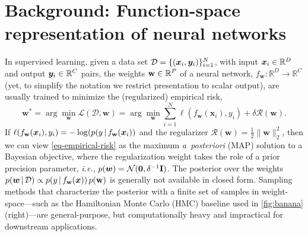 \documentclass{article} %
\makeatletter
\newcommand{\ie}{\textit{i.e.\@}\xspace}
\newcommand{\dataset}{\ensuremath{\mathcal{D}}}
\newcommand{\inputDomain}{\ensuremath{\mathbb{R}^{D}}}
\newcommand{\outputDomain}{\ensuremath{\mathbb{R}^{C}}}
\newcommand{\weights}{\ensuremath{\mathbf{w}}}
\newcommand{\mbf}[1]{\mathbf{#1}}
\renewcommand{\mid}{\,|\,}
\newcommand{\MI}{\mbf{I}}
\newcommand{\vzeros}{\mbf{0}}
\newcommand{\Norm}{\mathcal{N}}
\makeatother
\begin{document}
\section{Background: Function-space representation of neural networks}
\label{sec:methods}
%

%
In supervised learning, given a data set $\dataset = \{(\vx_{i} , \vy_{i})\}_{i=1}^{N}$, with input $\vx_i \in \inputDomain$ and output $\vy_i \in \outputDomain$ pairs, the weights $\weights \in \R^{P}$ of a neural network, $f_\mathbf{w}: \inputDomain \to \outputDomain$ (yet, to simplify the notation we restrict presentation to scalar output), are usually trained to minimize the (regularized) empirical risk,
%
\begin{equation} \label{eq-empirical-risk}
  \weights^{*} =
  \arg \min_{\weights} \mathcal{L}(\dataset,\weights) =
  \arg \min_{\weights} \textstyle\sum_{i=1}^{N} \ell(f_\weights(\mathbf{x}_{i}), y_i) + \delta \mathcal{R}(\weights).
\end{equation}
%
If $\ell(f_\weights(\vx_{i}), y_i) = -\log(p(y \mid f_\weights(\vx_{i}))$ and the regularizer $\mathcal{R}(\weights) = \frac{1}{2}\|\weights\|^{2}_2$, then we can view \cref{eq-empirical-risk} as the maximum {\it a~posteriori} (MAP) solution to a Bayesian objective, where the regularization weight takes the role of a prior precision parameter, \ie, $p(\vw) = \Norm(\vzeros, \delta^{-1} \MI)$.
The posterior over the weights ${p(\vw \mid \dataset) \propto p(y \mid f_{\weights}(\vx)) \, p(\weights)}$ is generally not available in closed form. Sampling methods that characterize the posterior with a finite set of samples in weight-space---such as the Hamiltonian Monte Carlo (HMC) baseline used in \cref{fig:banana} (right)---are general-purpose, but computationally heavy and impractical for downstream applications.
\end{document}

